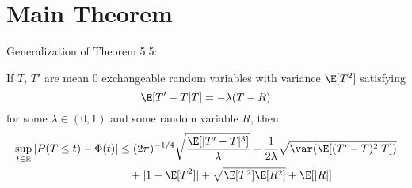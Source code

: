 \section{Main Theorem}
Generalization of Theorem 5.5:
\begin{theorem}
  If $T$, $T'$ are mean 0 exchangeable random variables with variance $\E[T^2]$
  satisfying
  \begin{equation*}
    \label{eq:13}
    \E[T'-T|T] = -\lambda(T-R)    
  \end{equation*}
  for some $\lambda \in (0,1)$ and some random variable $R$, then 
  \begin{equation*}
    \begin{split}
      \sup_{t \in \mathbb{R}} |P(T \leq t) - \Phi(t)|
      &\leq (2\pi)^{-1/4} \sqrt{\frac{\E [|T'-T|^3]}{\lambda}}
      + \frac{1}{2\lambda} \sqrt{\var (\E [(T'-T)^2|T])} \\
      &\quad + |1 - \E [T^2]| + \sqrt{\E [T^2]\E [R^2]} + \E [|R|]
    \end{split}
  \end{equation*}
\end{theorem}
